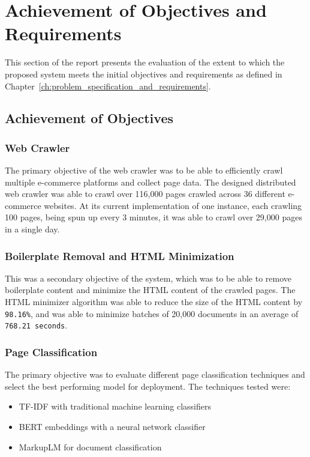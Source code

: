 \section{Achievement of Objectives and Requirements}\label{sec:achievement_of_objectives_and_requirements}

This section of the report presents the evaluation of the extent to which the proposed system meets the initial objectives and requirements as defined in Chapter~\ref{ch:problem_specification_and_requirements}.

\subsection{Achievement of Objectives}\label{subsec:achievement_of_objectives}

\subsubsection{Web Crawler}
The primary objective of the web crawler was to be able to efficiently crawl multiple e-commerce platforms and collect page data.
The designed distributed web crawler was able to crawl over 116,000 pages crawled across 36 different e-commerce websites.
At its current implementation of one instance, each crawling 100 pages, being spun up every 3 minutes, it was able to crawl over 29,000 pages in a single day.

\subsubsection{Boilerplate Removal and HTML Minimization}
This was a secondary objective of the system, which was to be able to remove boilerplate content and minimize the HTML content of the crawled pages.
The HTML minimizer algorithm was able to reduce the size of the HTML content by \texttt{98.16\%}, and was able to minimize batches of 20,000 documents in an average of \texttt{768.21 seconds}.

\subsubsection{Page Classification}
The primary objective was to evaluate different page classification techniques and select the best performing model for deployment.
The techniques tested were:
\begin{itemize}
    \item TF-IDF with traditional machine learning classifiers
    \item BERT embeddings with a neural network classifier
    \item MarkupLM for document classification
\end{itemize}

